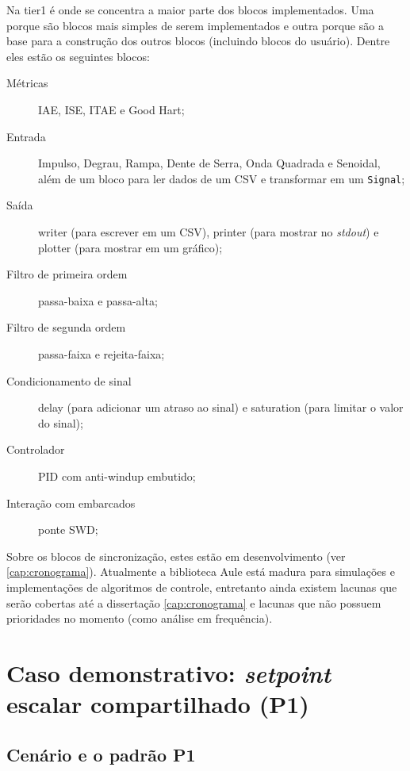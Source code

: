 Na tier1 é onde se concentra a maior parte dos blocos implementados. Uma porque são blocos mais simples de serem implementados e outra porque são a base para a construção dos outros blocos (incluindo blocos do usuário). Dentre eles estão os seguintes blocos:

\begin{description}
  \item[Métricas] IAE, ISE, ITAE e Good Hart;
  \item[Entrada] Impulso, Degrau, Rampa, Dente de Serra, Onda Quadrada e Senoidal, além de um bloco para ler dados de um \ac{CSV} e transformar em um \texttt{Signal};
  \item[Saída] writer (para escrever em um \ac{CSV}), printer (para mostrar no \textit{stdout}) e plotter (para mostrar em um gráfico);
  \item[Filtro de primeira ordem] passa-baixa e passa-alta;
  \item[Filtro de segunda ordem] passa-faixa e rejeita-faixa;
  \item[Condicionamento de sinal] delay (para adicionar um atraso ao sinal) e saturation (para limitar o valor do sinal);
  \item[Controlador] \ac{PID} com anti-windup embutido;
  \item[Interação com embarcados] ponte \ac{SWD};
\end{description}

Sobre os blocos de sincronização, estes estão em desenvolvimento (ver \ref{cap:cronograma}). Atualmente a biblioteca Aule está madura para simulações e implementações de algoritmos de controle, entretanto ainda existem lacunas que serão cobertas até a dissertação \ref{cap:cronograma} e lacunas que não possuem prioridades no momento (como análise em frequência).

\section{Caso demonstrativo: \textit{setpoint} escalar compartilhado (P1)}
\label{sec:case-setpoint}

\subsection{Cenário e o padrão P1}
\label{subsec:setpoint-scenario}

